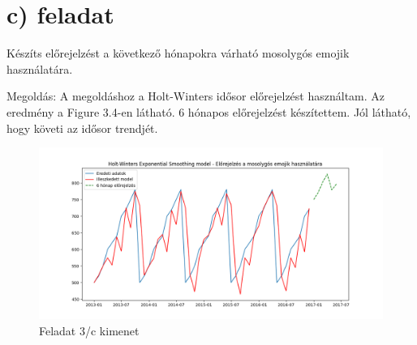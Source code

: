 \documentclass[11pt,a4paper,oneside]{report}
\begin{document}
\section{c) feladat}
Készíts előrejelzést a következő hónapokra várható mosolygós emojik használatára.

Megoldás:
A megoldáshoz a Holt-Winters idősor előrejelzést használtam. Az eredmény a Figure 3.4-en látható. 6 hónapos előrejelzést készítettem. Jól látható, hogy követi az idősor trendjét.

\begin{figure}[!ht]
  \begin{center}
    \includegraphics[scale=0.4]{Figure_7.png}
    \caption{Feladat 3/c kimenet}
    \label{fig:TexnicCenter}
  \end{center}
\end{figure}
\end{document}

